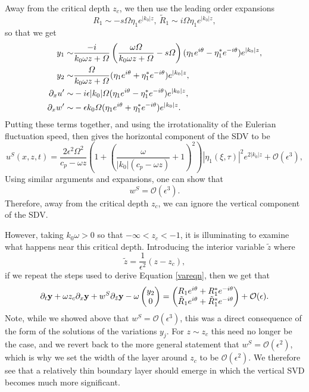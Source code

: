 \documentclass{JFM_Style/jfm}
\newcommand{\bp}{\begin{pmatrix}}
\newcommand{\ep}{\end{pmatrix}}
\newcommand{\pd}{\partial}
\begin{document}
Away from the critical depth $z_{c}$, we then use the leading order expansions
\[
R_{1} \sim -s\Omega\eta_{1}e^{|k_{0}|z}, ~ \tilde{R}_{1} \sim i\Omega\eta_{1}e^{|k_{0}|z}, 
\]
so that we get 
\begin{align*}
y_{1} \sim & \frac{-i}{k_{0}\omega z + \Omega}\left(\frac{\omega\Omega}{k_{0}\omega z + \Omega} - s\Omega \right)(\eta_{1}e^{i\theta} - \eta_{1}^{\ast}e^{-i\theta})e^{|k_{0}|z},\\ 
y_{2} \sim & \frac{\Omega}{k_{0}\omega z + \Omega}(\eta_{1}e^{i\theta} + \eta^{\ast}_{1}e^{-i\theta})e^{|k_{0}|z},\\
\p_{x}u' \sim & -i\epsilon|k_{0}|\Omega(\eta_{1}e^{i\theta}-\eta_{1}^{\ast}e^{-i\theta})e^{|k_{0}|z},\\
\pd_{x}w' \sim & - \epsilon k_{0}\Omega(\eta_{1}e^{i\theta}+\eta_{1}^{\ast}e^{-i\theta})e^{|k_{0}|z}.
\end{align*}
Putting these terms together, and using the irrotationality of the Eulerian fluctuation speed, then gives the horizontal component of the SDV to be 
\begin{equation}
u^{S}(x,z,t) = \frac{2\epsilon^{2}\Omega^{2}}{c_{p} - \omega z }\left(1 + \left(\frac{\omega}{|k_{0}|(c_{p} - \omega z )} + 1\right)^{2} \right)|\eta_{1}(\xi,\tau)|^{2}e^{2|k_{0}|z} + \mathcal{O}(\epsilon^{3}), 
\label{sdriftveloc}
\end{equation}
Using similar arguments and expansions, one can show that 
\[
w^{S} = \mathcal{O}(\epsilon^{3}).
\]
Therefore, away from the critical depth $z_{c}$, we can ignore the vertical component of the SDV.  

However, taking $k_{0}\omega >0$ so that $-\infty<z_{c}<-1$, it is illuminating to examine what happens near this critical depth.  Introducing the interior variable $\tilde{z}$ where
$$
\tilde{z} = \frac{1}{\epsilon^{2}}\left(z - z_{c} \right), 
$$
if we repeat the steps used to derive Equation \eqref{vareqn}, then we get that
\begin{equation}
\pd_{t}{\bf y} + \omega z_{c} \pd_{x}{\bf y}  + w^{S}\pd_{\tilde{z}}{\bf y} - \omega \bp y_{2}\\ 0 \ep = \bp R_{1}e^{i\theta}+R^{\ast}_{1}e^{-i\theta}\\ \tilde{R}_{1}e^{i\theta}+\tilde{R}^{\ast}_{1}e^{-i\theta} \ep + \mathcal{O}(\epsilon).
\label{modvareqn}
\end{equation}
 Note, while we showed above that $w^{S}=\mathcal{O}(\epsilon^{3})$, this was a direct consequence of the form of the solutions of the variations $y_{j}$.  For $z\sim z_{c}$ this need no longer be the case, and we revert back to the more general statement that  $w^{S}=\mathcal{O}(\epsilon^{2})$, which is why we set the width of the layer around $z_{c}$ to be $\mathcal{O}(\epsilon^{2})$.  We therefore see that a relatively thin boundary layer should emerge in which the vertical SVD becomes much more significant.  
 
\end{document}
